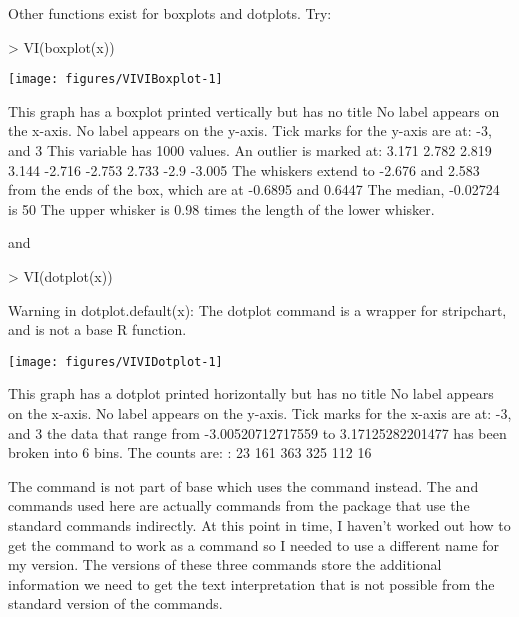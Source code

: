 Other functions exist for boxplots and dotplots. Try:
\begin{Schunk}
\begin{Sinput}
> VI(boxplot(x))
\end{Sinput}

\texttt{[image: figures/VIVIBoxplot-1]} \begin{Soutput}
This graph has a boxplot printed vertically
but has no title
No label appears on the x-axis.
No label appears on the y-axis.
Tick marks for the y-axis are at: -3, and 3 
This variable has 1000 values.
An outlier is marked at: 3.171 2.782 2.819 3.144 -2.716 -2.753 2.733 -2.9 -3.005 
The whiskers extend to -2.676 and 2.583 from the ends of the box, 
which are at -0.6895 and 0.6447 
The median, -0.02724 is 50 % from the lower end of the box to the upper end.
The upper whisker is 0.98 times the length of the lower whisker.
\end{Soutput}
\end{Schunk}
 and
\begin{Schunk}
\begin{Sinput}
> VI(dotplot(x))
\end{Sinput}
\begin{Soutput}
Warning in dotplot.default(x): The dotplot command is a wrapper for stripchart, and is not a base R function.
\end{Soutput}

\texttt{[image: figures/VIVIDotplot-1]} \begin{Soutput}
This graph has a dotplot printed horizontally
but has no title
No label appears on the x-axis.
No label appears on the y-axis.
Tick marks for the x-axis are at: -3, and 3 
the data that range from -3.00520712717559 to 3.17125282201477 has been broken into 6 bins.
The counts are:
: 23 161 363 325 112 16 
\end{Soutput}
\end{Schunk}

The  command is not part of base \R{} which uses the  command instead. The  and  commands used here are actually commands from the  package that use the standard commands indirectly. At this point in time, I haven't worked out how to get the  command to work as a  command so I needed to use a different name for my version. The  versions of these three commands store the additional information we need to get the text interpretation that is not possible from the standard version of the commands.



